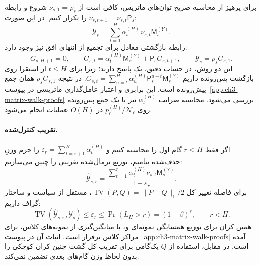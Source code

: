 برای پرهیز از محاسبه صریح توان‌های ماتریس، کافی است از $\nu_{s,1}=\rho_s$ شروع و رابطه
$\nu_{s,t+1}=\nu_{s,t}\mathsf P_s$ را تکرار کنیم. در این صورت:
\begin{equation}\label{eq:ch3-matrix-forward-recursion}
\boxed{\mathscr Y_s
=\sum_{t=1}^{H}\alpha_t^{(H)}\,\nu_{s,t}\mathsf M_s^{(Y)}.}
\end{equation}
رابطه بازگشتی معادل برای تجمیع از انتهای افق نیز وجود دارد:
\begin{equation}\label{eq:ch3-matrix-backward-recursion}
G_{s,H+1}=0,\qquad
G_{s,t}=\alpha_t^{(H)}\mathsf M_s^{(Y)}+\mathsf P_sG_{s,t+1},
\qquad \mathscr Y_s=\rho_sG_{s,1}.
\end{equation}
این دو روش، در حساب دقیق، یک پاسخ دارند؛
زیرا برای $t\le H$ از استقرا روی بازگشت پس‌رونده داریم
$G_{s,t}=\sum_{u=t}^{H}\alpha_u^{(H)}
\mathsf P_s^{u-t}\mathsf M_s^{(Y)}$.
در نتیجه $\rho_sG_{s,1}$ همان جمع پیش‌رونده است.
این برابری و اعتبار عامل‌گذاری ماتریسی در
پیوست~\ref{app:ch3-matrix-walk-proofs} بررسی می‌شود.
محاسبه ضرایب $\alpha_t^{(H)}$ نیز با یک جمع پس‌رونده
روی $p_\ell^{(H)}/\mathcal N_\ell$ در $O(H)$ عملیات انجام می‌شود.

\paragraph{تقریب کنترل‌شده.}
اگر فقط $r<H$ گام اول را محاسبه کنیم و
$\varepsilon_r=\sum_{t=r+1}^{H}\alpha_t^{(H)}$
را جرم وزنِ حذف‌شده بنامیم، توزیع نرمال‌شده تقریبی را چنین می‌سازیم:
\begin{equation}\label{eq:ch3-matrix-truncated}
\widehat{\mathscr Y}_{s,r}
=\frac{\sum_{t=1}^{r}\alpha_t^{(H)}
\nu_{s,t}\mathsf M_s^{(Y)}}{1-\varepsilon_r}.
\end{equation}
برای فاصله تغییر کل $\operatorname{TV}(P,Q)=\|P-Q\|_1/2$، مستقل از سیاست و ساختار گراف داریم:
\begin{equation}\label{eq:ch3-matrix-truncation-bound}
\boxed{\operatorname{TV}\!\left(
\widehat{\mathscr Y}_{s,r},\mathscr Y_s\right)
\le\varepsilon_r
\le\Pr(L_H>r)=(1-\beta)^r,\qquad r<H.}
\end{equation}
همین کران برای توزیع همسایگی نمونه‌ای و، با میانگین‌گیری از نمونه‌های کلاس، برای مراکز کلاس برقرار است. اثبات آن در پیوست~\ref{app:ch3-matrix-walk-proofs} آمده است. در مقابل، استفاده از $Q$ یک‌گامی برای تقریب کل گشت چنین کران کوچکی را بدون لحاظ وزن گام‌های بعدی تضمین نمی‌کند.

